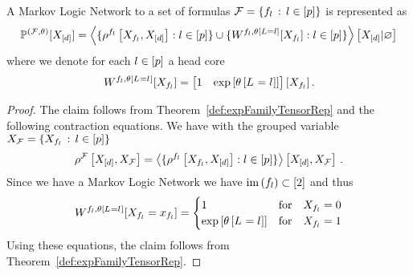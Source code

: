 \begin{theorem}
	A Markov Logic Network to a set of formulas $\mathcal{F} = \{f_{l} \, : \, l\in[p]\}$ is represented as
	\begin{align*}
		\mathbb{P}^{(\mathcal{F},\theta)}[X_{[d]}] = 
		\left\langle 
			\{\rho^{f_{l}}\left[X_{f_{l}},X_{[d]}\right] : l\in[p] \} 
			\cup \{ 
			W^{f_{l},\theta\left[L=l\right]}[X_{f_{l}}] 
			: l\in[p] \}
		\right\rangle \left[ X_{[d]} | \varnothing \right]
	\end{align*}
	where we denote for each $l\in[p]$ a head core
	\begin{align*}
		W^{f_{l},\theta\left[L_{}=l_{}\right]}[X_{f_{l}}] 
		= \begin{bmatrix} 1 & \mathrm{exp}\left[\theta\left[L_{}=l_{}\right]\right] \end{bmatrix}[X_{f_{l}}] \, .
	\end{align*}
\end{theorem}
\begin{proof}
	The claim follows from Theorem~\ref{def:expFamilyTensorRep} and the following contraction equations.
	We have with the grouped variable $X_{\mathcal{F}} = \{X_{f_{l}}\, : \, l\in[p]\}$
	\begin{align*}
		\rho^{\mathcal{F}}\left[X_{[d]},X_{\mathcal{F}}\right]
		= \left\langle \{\rho^{f_{l}}\left[X_{f_{l}},X_{[d]}\right] : l\in[p] \}\right\rangle \left[ X_{[d]},X_{\mathcal{F}} \right] \, .
	\end{align*}
	Since we have a Markov Logic Network we have $\mathrm{im}\left(f_{l}\right)\subset [2]$ and thus
	\begin{align*}
	 	W^{f_{l},\theta\left[L_{}=l_{}\right]}[X_{f_{l}}=x_{f_{l}}] 
		= \begin{cases}
			1 & \text{for} \quad X_{f_{l}} = 0 \\
			\mathrm{exp}\left[\theta\left[L_{}=l_{}\right]\right] & \text{for} \quad X_{f_{l}} = 1
		\end{cases}  
	\end{align*}
	Using these equations, the claim follows from Theorem~\ref{def:expFamilyTensorRep}.
\end{proof}

